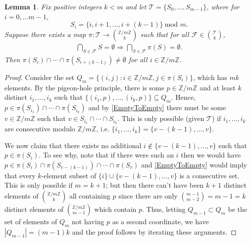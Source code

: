 \documentclass[journal, onecolumn]{IEEEtran}
\newtheorem{lemma}{Lemma}
\begin{document}

\begin{lemma}\label{NonEmptyLemma} Fix positive integers $k < m$ and let $\mathcal{T} = \{S_0,\ldots,S_{m-1}\}$, where for $i = 0, \ldots m -1$,
\[S_{i} = \{i, i + 1, \ldots, i + (k-1)\}  \ \text{mod } m.\]
Suppose there exists a map $\pi: \mathcal{T} \to {\mathbb{Z}/m\mathbb{Z} \choose k}$ such that for all $ \mathcal{F} \in {\mathcal{T} \choose k}$,
\begin{align}\label{EmptyToEmpty}
 \bigcap_{S \in \mathcal{F}} S = \emptyset \Longrightarrow \bigcap_{S \in \mathcal{F}} \pi(S) = \emptyset.
\end{align}
%
Then  $\pi(S_i) \cap \cdots \cap \pi(S_{i+(k-1)}) \neq \emptyset$ for all $i \in \mathbb{Z}/m\mathbb{Z}$.
\end{lemma}

\begin{proof} Consider the set $Q_m = \{ (i,j) : i \in \mathbb{Z}/m\mathbb{Z}, j \in \pi(S_i) \}$, which has $mk$ elements. By the pigeon-hole principle, there is some $p \in \mathbb{Z}/m\mathbb{Z}$ and at least $k$ distinct $i_1, \ldots, i_k$ such that $\{(i_1, p), \ldots, (i_k, p)\} \subseteq Q_m$. Hence, $p \in \pi(S_{i_1}) \cap \cdots \cap \pi(S_{i_k})$ and by \eqref{EmptyToEmpty} there must be some $v \in \mathbb{Z}/m\mathbb{Z}$ such that $v \in S_{i_1} \cap \cdots \cap S_{i_k}$. This is only possible (given $\mathcal{T}$) if $i_1, \ldots, i_k$ are consecutive modulo $\mathbb{Z}/m\mathbb{Z}$, i.e. $\{i_1, \ldots, i_k\} = \{v - (k-1), \ldots, v\}$. 

We now claim that there exists no additional $i \notin \{v - (k-1), \ldots, v\}$ such that $p \in \pi(S_{i})$. To see why, note that if there were such an $i$ then we would have $p \in \pi(S_{i}) \cap \pi(S_{v - (k-1)}) \cap \cdots \cap \pi(S_{v})$ and \eqref{EmptyToEmpty} would imply that every $k$-element subset of $\{i\} \cup \{v-(k-1), \ldots, v\}$ is a consecutive set. This is only possible if $m = k+1$; but then there can't have been $k+1$ distinct elements of ${\mathbb{Z}/m\mathbb{Z} \choose k}$ all containing $p$ since there are only ${m-1 \choose m-2}  = m-1 = k$ distinct elements of ${\mathbb{Z}/m\mathbb{Z} \choose m-1}$ which contain $p$. Thus, letting $Q_{m-1} \subset Q_m$ be the set of elements of $Q_m$ not having $p$ as a second coordinate, we have $|Q_{m-1}| = (m-1)k$ and the proof follows by iterating these arguments.
\end{proof}

\end{document}
